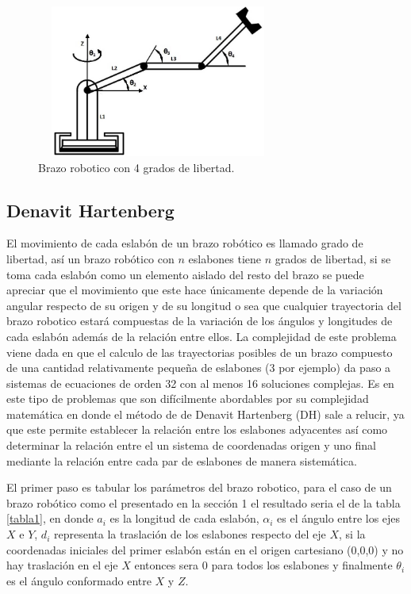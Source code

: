 \documentclass[12pt]{article}
\begin{document}
\begin{figure}
\centering
\includegraphics[width=8cm,height=5cm]{imag/Brazo.png}
\caption{Brazo robotico con 4 grados de libertad.}
\label{Brazo}
\end{figure}

\subsection{Denavit Hartenberg}

El movimiento de cada eslabón de un brazo robótico es llamado grado de libertad, así un brazo robótico con $n$ eslabones tiene $n$ grados de libertad, si se toma cada eslabón como un elemento aislado del resto del brazo se puede apreciar que el movimiento que este hace únicamente depende de la variación angular respecto de su origen y de su longitud o sea que cualquier trayectoria del brazo robotico estará compuestas de la variación de los ángulos y longitudes de cada eslabón además de la relación entre ellos. La complejidad de este problema viene dada en que el calculo de las trayectorias posibles de un brazo compuesto de una cantidad relativamente pequeña de eslabones (3 por ejemplo) \cite{denavit-1955a} da paso a sistemas de ecuaciones de orden 32 con al menos 16 soluciones complejas. Es en este tipo de problemas que son difícilmente abordables por su complejidad matemática en donde el método de de Denavit Hartenberg (DH) sale a relucir, ya que este permite establecer la relación entre los eslabones adyacentes así como determinar la relación entre el un sistema de coordenadas origen y uno final mediante la relación entre cada par de eslabones de manera sistemática.

El primer paso es tabular los parámetros del brazo robotico, para el caso de un brazo robótico como el presentado en la sección 1 el resultado seria el de la tabla \ref{tabla1}, en donde $a_{i}$ es la longitud de cada eslabón, $\alpha_{i}$ es el ángulo entre los ejes $X$ e $Y$, $d_{i}$ representa la traslación de los eslabones respecto del eje $X$, si la coordenadas iniciales del primer eslabón están en el origen cartesiano (0,0,0) y no hay traslación en el eje $X$ entonces sera 0 para todos los eslabones y finalmente $\theta_{i}$ es el ángulo conformado entre $X$ y $Z$.
\end{document}
